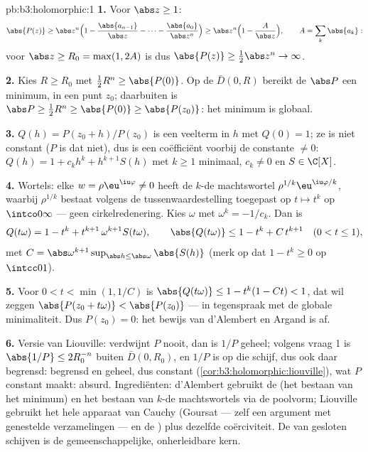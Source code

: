 \begin{solution}{pb:b3:holomorphic:1}
\textbf{1.} Voor $\abs z \geq 1$:
\[
\abs{P(z)} \geq \abs z^n\Bigl(1 -
\frac{\abs{a_{n-1}}}{\abs z} - \dots -
\frac{\abs{a_0}}{\abs z^n}\Bigr)
\geq \abs z^n\Bigl(1 - \frac{A}{\abs z}\Bigr),
\qquad A = \sum_k\abs{a_k} :
\]
voor $\abs z \geq R_0 = \max(1, 2A)$ is dus $\abs{P(z)} \geq
\frac12\abs z^n \to \infty$.

\textbf{2.} Kies $R \geq R_0$ met $\frac12R^n \geq \abs{P(0)}$.
Op de  $\bar D(0, R)$ bereikt de  $\abs P$ een
minimum, in een punt $z_0$; daarbuiten is $\abs P \geq
\frac12R^n \geq \abs{P(0)} \geq \abs{P(z_0)}$: het minimum is
globaal.

\textbf{3.} $Q(h) = P(z_0 + h)/P(z_0)$ is een veelterm in $h$ met
$Q(0) = 1$; ze is niet constant ($P$ is dat niet), dus is een
coëfficiënt voorbij de constante $\neq 0$: $Q(h) = 1 + c_kh^k +
h^{k+1}S(h)$ met $k \geq 1$ minimaal, $c_k \neq 0$ en $S \in
\C[X]$.

\textbf{4.} Wortels: elke $w = \rho\eu^{\iu\varphi} \neq 0$ heeft
de $k$-de machtswortel $\rho^{1/k}\eu^{\iu\varphi/k}$, waarbij
$\rho^{1/k}$ bestaat volgens de tussenwaardestelling toegepast op
$t \mapsto t^k$ op $\intco0\infty$ --- geen cirkelredenering.
Kies $\omega$ met $\omega^k = -1/c_k$. Dan is
\[
Q(t\omega) = 1 - t^k + t^{k+1}\,\omega^{k+1}S(t\omega),
\qquad
\abs{Q(t\omega)} \leq 1 - t^k + C\,t^{k+1}
\quad (0 < t \leq 1),
\]
met $C = \abs\omega^{k+1}\sup_{\abs h \leq
\abs\omega}\abs{S(h)}$ (merk op dat $1 - t^k \geq 0$ op
$\intcc01$).

\textbf{5.} Voor $0 < t < \min(1, 1/C)$ is $\abs{Q(t\omega)} \leq
1 - t^k(1 - Ct) < 1$, dat wil zeggen $\abs{P(z_0 + t\omega)} <
\abs{P(z_0)}$ --- in tegenspraak met de globale minimaliteit. Dus
$P(z_0) = 0$: het bewijs van d'Alembert en Argand is af.

\textbf{6.} Versie van Liouville: verdwijnt $P$ nooit, dan is
$1/P$ geheel; volgens vraag 1 is $\abs{1/P} \leq 2R_0^{-n}$
buiten $\bar D(0, R_0)$, en $1/P$ is  op die 
schijf, dus ook daar begrensd: begrensd en geheel, dus constant
(\cref{cor:b3:holomorphic:liouville}), wat $P$ constant maakt:
absurd. Ingrediënten: d'Alembert gebruikt de  (het
bestaan van het minimum) en het bestaan van $k$-de machtswortels
via de poolvorm; Liouville gebruikt het hele apparaat van Cauchy
(Goursat --- zelf een argument met genestelde 
verzamelingen --- en de ) plus dezelfde
coërciviteit. De  van gesloten schijven is de
gemeenschappelijke, onherleidbare kern.


\end{solution}
